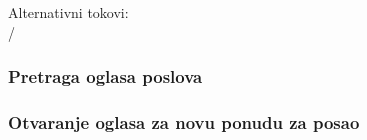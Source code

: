 \noindent Alternativni tokovi: 
\\/

\subsubsection{Pretraga oglasa poslova}
\label{su: pretraga oglasa poslova}

\subsubsection{Otvaranje oglasa za novu ponudu za posao}
\label{su: otvaranje oglasa za novu ponudu za posao}

\newpage